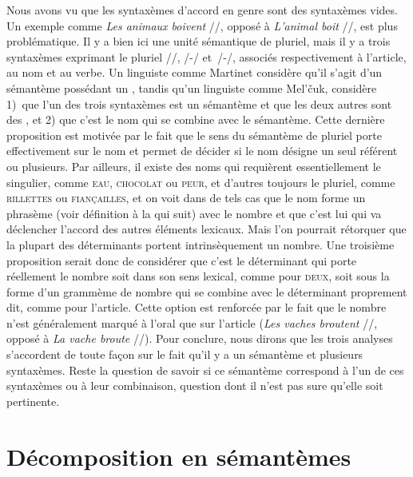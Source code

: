 {    Nous avons vu que les syntaxèmes d’accord en genre sont des syntaxèmes vides. Un exemple comme \textit{Les animaux boivent} //, opposé à \textit{L’animal boit} //, est plus problématique. Il y a bien ici une unité sémantique de pluriel, mais il y a trois syntaxèmes exprimant le pluriel //, /-/ et~/-/, associés respectivement à l’article, au nom et au verbe. Un linguiste comme Martinet considère qu’il s’agit d’un sémantème possédant un , tandis qu’un linguiste comme Mel’čuk, considère 1)~que l’un des trois syntaxèmes est un sémantème et que les deux autres sont des , et 2) que c’est le nom qui se combine avec le sémantème. Cette dernière proposition est motivée par le fait que le sens du sémantème de pluriel porte effectivement sur le nom et permet de décider si le nom désigne un seul référent ou plusieurs. Par ailleurs, il existe des noms qui requièrent essentiellement le singulier, comme \textsc{eau}, \textsc{chocolat} ou \textsc{peur}, et d’autres toujours le pluriel, comme \textsc{rillettes} ou \textsc{fiançailles}, et on voit dans de tels cas que le nom forme un phrasème (voir définition à la  qui suit) avec le nombre et que c’est lui qui va déclencher l’accord des autres éléments lexicaux. Mais l’on pourrait rétorquer que la plupart des déterminants portent intrinsèquement un nombre. Une troisième proposition serait donc de considérer que c’est le déterminant qui porte réellement le nombre soit dans son sens lexical, comme pour \textsc{deux}, soit sous la forme d’un grammème de nombre qui se combine avec le déterminant proprement dit, comme pour l’article. Cette option est renforcée par le fait que le nombre n’est généralement marqué à l’oral que sur l’article (\textit{Les vaches broutent} //, opposé à \textit{La vache broute} //). Pour conclure, nous dirons que les trois analyses s’accordent de toute façon sur le fait qu’il y a un sémantème et plusieurs syntaxèmes. Reste la question de savoir si ce sémantème correspond à l’un de ces syntaxèmes ou à leur combinaison, question dont il n’est pas sure qu’elle soit pertinente.
}
\section{Décomposition en sémantèmes}\label{sec:2.3.5}


